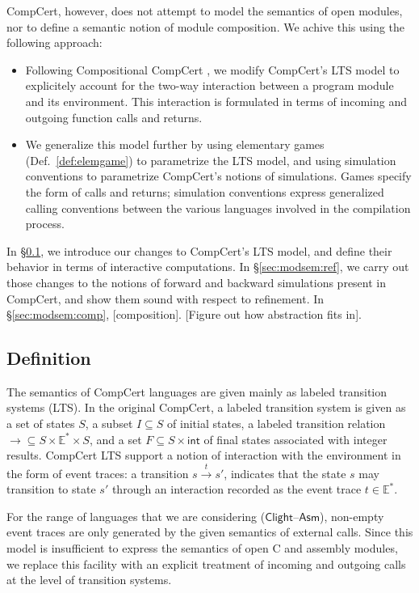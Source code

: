 \documentclass[acmsmall,timestamp,review,anonymous]{acmart}
\newcommand{\kw}[1]{\ensuremath{ \mathsf{#1} }}
\begin{document}
CompCert, however,
does not attempt to model the semantics of open modules,
nor to define a semantic notion of module composition.
We achive this using the following approach:
\begin{itemize}
\item Following Compositional CompCert \cite{compcompcert},
  we modify CompCert's LTS model
  to explicitely account for the two-way interaction
  between a program module and its environment.
  This interaction is formulated
  in terms of incoming and outgoing function calls and returns.
\item We generalize this model further by
  using elementary games (Def.~\ref{def:elemgame})
  to parametrize the LTS model, and
  using simulation conventions to parametrize
  CompCert's notions of simulations.
  Games specify the form of calls and returns;
  simulation conventions express
  generalized calling conventions between the various
  languages involved in the compilation process.
\end{itemize}

In \S\ref{sec:modsem:def},
we introduce our changes to CompCert's LTS model,
and define their behavior in terms of interactive computations.
In \S\ref{sec:modsem:ref},
we carry out those changes to the notions of
forward and backward simulations
present in CompCert,
and show them sound with respect to refinement.
In \S\ref{sec:modsem:comp},
[composition].
[Figure out how abstraction fits in].


\subsection{Definition} %
\label{sec:modsem:def}

The semantics of CompCert languages are given mainly
as labeled transition systems (LTS).
In the original CompCert,
a labeled transition system is given as
a set of states $S$,
a subset $I \subseteq S$ of initial states,
a labeled transition relation
${\rightarrow} \subseteq S \times \mathbb{E}^* \times S$,
and a set
$F \subseteq S \times \kw{int}$
of final states associated with integer results.
CompCert LTS support a notion of interaction with the environment
in the form of event traces:
a transition $s \stackrel{t}{\rightarrow} s'$,
indicates that the state $s$ may transition to state $s'$
through an interaction recorded as the event trace $t \in \mathbb{E}^*$.

For the range of languages that we are considering
($\kw{Clight}$--$\kw{Asm}$),
non-empty event traces are only generated by
the given semantics of external calls.
Since this model is insufficient to express
the semantics of open C and assembly modules,
we replace this facility with
an explicit treatment of incoming and outgoing calls
at the level of transition systems.
\end{document}

